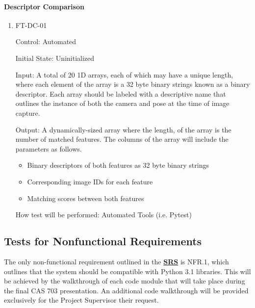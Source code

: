 \documentclass[12pt, titlepage]{article}
\begin{document}
\paragraph{Descriptor Comparison}
\begin{enumerate}
\item \hypertarget{FT-DC-01}{FT-DC-01\\}
Control: Automated		

Initial State: Uninitialized

Input: A total of 20 1D arrays, each of which may have a unique length, where each element of the 
array is a 32 byte binary strings known as a binary descriptor. Each array should be labeled with a descriptive 
name that outlines the instance of both the camera and pose at the time of image capture.

Output: A dynamically-sized array where the length, of the array is the number of matched features. The columns 
of the array will include the parameters as follows.
\begin{itemize}
\item Binary descriptors of both features as 32 byte binary strings
\item Corresponding image IDs for each feature
\item Matching scores between both features
\end{itemize}

How test will be performed: Automated Tools (i.e. Pytest)
\end{enumerate}

\subsection{Tests for Nonfunctional Requirements}\label{NFR_Tests}
The only non-functional requirement outlined in the 
\textbf{\href{https://github.com/KiranSingh15/CAS-741-Image-Correspondences/blob/main/docs/SRS/SRS.pdf}
{SRS}} is NFR.1, which outlines that the system should be compatible with Python 3.1 libraries. 
This will be achieved by the walkthrough of each code module that will take place during the 
final CAS 703 presentation. An additional code walkthrough will be provided exclusively for
the Project Supervisor their request.

\newpage
\end{document}
